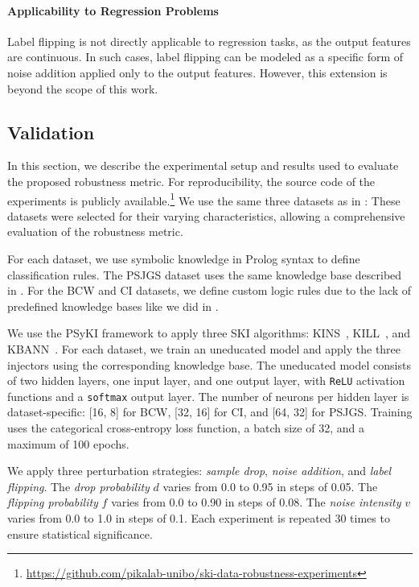 %
\paragraph{Applicability to Regression Problems}
%
Label flipping is not directly applicable to regression tasks, as the output features are continuous.
%
In such cases, label flipping can be modeled as a specific form of noise addition applied only to the output features.
%
However, this extension is beyond the scope of this work.


\subsection{Validation}\label{subsec:empirical-study-on-the-robustness-of-ski-methods-validation}
%
In this section, we describe the experimental setup and results used to evaluate the proposed robustness metric.
%
For reproducibility, the source code of the experiments is publicly available.\footnote{\url{https://github.com/pikalab-unibo/ski-data-robustness-experiments}}
%
We use the same three datasets as in :
%
These datasets were selected for their varying characteristics, allowing a comprehensive evaluation of the robustness metric.


For each dataset, we use symbolic knowledge in Prolog syntax to define classification rules.
%
The \gls{PSJGS} dataset uses the same knowledge base described in .
%
For the \gls{BCW} and \gls{CI} datasets, we define custom logic rules due to the lack of predefined knowledge bases like we did in .


We use the \gls{PSyKI} framework to apply three \gls{SKI} algorithms: \gls{KINS}~\cite{kins-cilc2022}, \gls{KILL}~\cite{kill-woa2022}, and \gls{KBANN}~\cite{DBLP:conf/aaai/TowellSN90}.
%
For each dataset, we train an uneducated model and apply the three injectors using the corresponding knowledge base.
%
The uneducated model consists of two hidden layers, one input layer, and one output layer, with \texttt{ReLU} activation functions and a \texttt{softmax} output layer.
%
The number of neurons per hidden layer is dataset-specific: [16, 8] for \gls{BCW}, [32, 16] for \gls{CI}, and [64, 32] for \gls{PSJGS}.
%
Training uses the categorical cross-entropy loss function, a batch size of 32, and a maximum of 100 epochs.


We apply three perturbation strategies: \emph{sample drop}, \emph{noise addition}, and \emph{label flipping}.
%
The \emph{drop probability} \(d\) varies from 0.0 to 0.95 in steps of 0.05.
%
The \emph{flipping probability} \(f\) varies from 0.0 to 0.90 in steps of 0.08.
%
The \emph{noise intensity} \(v\) varies from 0.0 to 1.0 in steps of 0.1.
%
Each experiment is repeated 30 times to ensure statistical significance.

